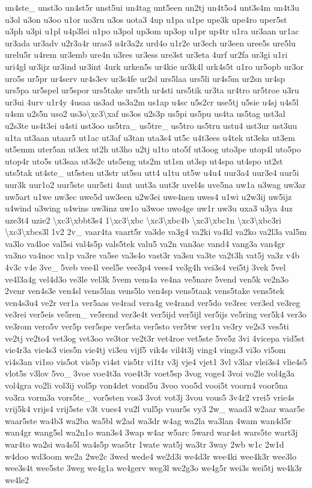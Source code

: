 \begin{DoxyCompactItemize}
un4ste\-\_\- unst3o un4st5r unst5ui un4tag unt5een un2tj un4t5o4 unt3s4m un4t3u u3ol u3on u3oo u1or uo3ru u3os uota3 4up u1pa u1pe upe3k upe4ro uper5st u3ph u3pi u1pl u4p3lei u1po u3pol up3om up3op u1pr up4tr u1ra ur3aan ur1ac ur3ada ur3adv u2r3a4r uras3 u4r3a2z urd4o u1r2e ur3ech ur3een uree5s ure5lu urelu5r u4rem ur3emb ure4n u3res ur3ess ure3st ur3eta 4urf ur2fa ur3gi u1ri uri4gl ur3ijz ur3ind ur3int 4urk urken5s ur4kie ur3k4l urk4s5t u1ro ur5opb ur3or uro5s ur5pr ur4serv ur4s3ev ur3s4fe ur2sl urs5laa urs5li ur4s5m ur2sn ur4sp urs5pa ur5spel ur5spor urs5take urs5th ur4sti urs5tik ur3ta ur4tro ur5troe u3ru ur3ui 4urv u1r4y 4usaa us3ad us3a2m us1ap u4sc u5s2cr use5tj u5sie u4sj u4s5l u4sm u2s5n uso2 us3o\textbackslash{}xc3\textbackslash{}xaf us3os u2s3p us5pi us5pu us4ta us5tag ust3al u2s3te us4t3ei u4sti ust3oo us5tra\-\_\- us5tre\-\_\- us5tro us5tru ustu4 ust3ur ust3uu u1ta ut3aan utaar5 ut1ac ut3af u3tan uta3s4 ut5c u4t3ees u4tek ut3eks ut3em ut5emm uter5an ut3ex ut2h ut3ho u2tj u1to uto5f ut3oog uto3pe utop4l uto5po utop4r uto5s ut3saa ut3s2c uts5eng uts2m ut1sn ut3sp ut4spa ut4spo ut2st uts5tak ut4ste\-\_\- ut5sten ut3str ut5su utt4 u1tu ut5w u4u4 uur3a4 uur3e4 uur5i uur3k uur1o2 uur5ste uur5sti 4uut uut3a uut3r uvel4s uve5na uw1a u3wag uw3ar uw5art u1we uw3ec uwe5d uw3een u2w3ei uwe4nen uwes4 u1wi u2w3ij uw5ijz u4wind u3wing u4wins uw3inz uw1o u3woe uwo4ge uw1r uw3u uxa3 u3ya 4uz uze3t4 uzie2 \textbackslash{}xc3\textbackslash{}xbbt3s4 1\textbackslash{}xc3\textbackslash{}xbc \textbackslash{}xc3\textbackslash{}xbc4b \textbackslash{}xc3\textbackslash{}xbc1n \textbackslash{}xc3\textbackslash{}xbc3ri \textbackslash{}xc3\textbackslash{}xbcs3l 1v2 2v\-\_\- vaar4ta vaart5r va3de va3g4 va2ki va4kl va2ko va2l3a val5m va3lo va4loe val5si val4s5p vals5tek valu5 va2n van3ac vand4 vang3a van4gr va3no va4noc va1p va3re va5se va3s4o vast3r va3su va3te va2t3h vat5j va3z v4b 4v3c v4e 3ve\-\_\- 5veb vee4l veel5e vee3p4 vees4 ve3g4h vei3s4 vei5tj 3vek 5vel ve4l3a4g vel4d3o ve3le vel3k 5vem vem4a ve4na ve5nare 5vend ven5k ve2n3o 2venr ven4s3e ven4sl vens5lan vens5lo ven4sp vens5taak vens5take vens5tek ven4s3u4 ve2r ver1a ver5aas ve4rad vera4g ve4rand ver5do ve3rec ver3ed ve3reg ve3rei ver5eis ve5ren\-\_\- ve5rend ver3e4t ver5ijd ver5ijl ver5ijs ve5ring ver5k4 ver3o ve3rom vero5v ver5p ver5spe ver5sta ver5sto ver5tw ver1u ve3ry ve2s3 ves5ti ve2tj ve2to4 vet3og vet3oo ve3tor ve2t3r vet4roe vet5ste 5ve5z 3vi 4vicepa vid5st vie4r3a vie4s3 vies5n vie4tj vi3eu vijf5 vik4s vil4t3j ving4 vings3 vi3o vi5om vi4s3an vi1so vis5ot vis5p vi4st vis5tr vi1tr v3j vje4 vjet1 3vl v3lar vlei3s4 vlie4s5 vlot5s v3lov 5vo\-\_\- 3voe voe4t3a voe4t3r voet5sp 3vog voge4 3voi vo2le vol4g3a vol4gra vo2li vol3ij vol5p von4det vond5u 3voo voo5d vooi5t voorn4 voor5na vo3ra vorm3a vors5te\-\_\- vor5sten vos3 3vot vot3j 3vou vous5 3v4r2 vrei5 vrie4s vrij5k4 vrijs4 vrij5ste v3t vues4 vu2l vul5p vuur5s vy3 2w\-\_\- waad3 w2aar waar5e waar5ste wa4b3 wa2ba wa5bl w2ad wa3dr w4ag wa2la wa3lan 4wam wan4d5r wan4gr wang5sl wa2n1o wan3s4 3wap w4ar w5arc 5ward war4st wars5te wart3j war4to wa2si wa4s5l wa4s5p was5tr 1wate wat5j wa3tr 3way 2wb w1c 2w1d w4doo wd3oom we2a 2we2c 3wed wede4 we2d3i we4d3r wee4ki wee4k3r wee3lo wee3s4t wee5ste 3weg we4g1a we4gerv weg3l we2g3o we4g5r wei3s wei5tj we4k3r we4le2 
\end{DoxyCompactItemize}
